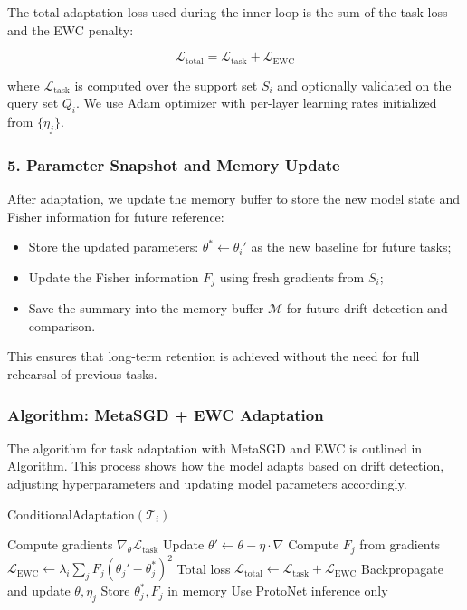 \documentclass[conference]{IEEEtran}
\begin{document}
The total adaptation loss used during the inner loop is the sum of the task loss and the EWC penalty:

\begin{equation}
\mathcal{L}_{\text{total}} = \mathcal{L}_{\text{task}} + \mathcal{L}_{\text{EWC}}
\end{equation}

where $\mathcal{L}_{\text{task}}$ is computed over the support set $S_i$ and optionally validated on the query set $Q_i$. We use Adam optimizer with per-layer learning rates initialized from $\{\eta_j\}$.

\subsubsection*{5. Parameter Snapshot and Memory Update}

After adaptation, we update the memory buffer to store the new model state and Fisher information for future reference:
\begin{itemize}
    \item Store the updated parameters: $\theta^* \gets \theta_i'$ as the new baseline for future tasks;
    \item Update the Fisher information $F_j$ using fresh gradients from $S_i$;
    \item Save the summary into the memory buffer $\mathcal{M}$ for future drift detection and comparison.
\end{itemize}

This ensures that long-term retention is achieved without the need for full rehearsal of previous tasks.

\subsubsection*{Algorithm: MetaSGD + EWC Adaptation}

The algorithm for task adaptation with MetaSGD and EWC is outlined in Algorithm. This process shows how the model adapts based on drift detection, adjusting hyperparameters and updating model parameters accordingly.

\begin{algorithm}[H]
\caption{ConditionalAdaptation$(\mathcal{T}_i)$}
\begin{algorithmic}[1]
    \State Compute gradients $\nabla_\theta \mathcal{L}_{\text{task}}$
    \State Update $\theta' \gets \theta - \eta \cdot \nabla$
    \State Compute $F_j$ from gradients
    \State $\mathcal{L}_{\text{EWC}} \gets \lambda_i \sum_j F_j (\theta_j' - \theta_j^*)^2$
    \State Total loss $\mathcal{L}_{\text{total}} \gets \mathcal{L}_{\text{task}} + \mathcal{L}_{\text{EWC}}$
    \State Backpropagate and update $\theta, \eta_j$
    \State Store $\theta_j^*, F_j$ in memory
\Else
    \State Use ProtoNet inference only
\EndIf
\end{algorithmic}
\end{algorithm}
\end{document}
